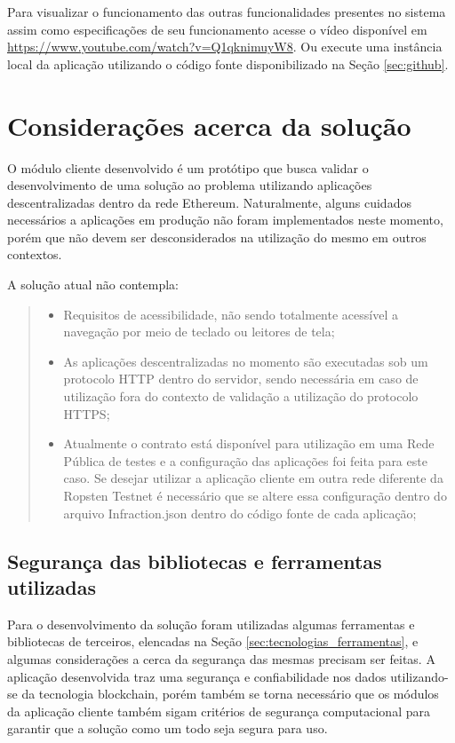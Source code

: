 Para visualizar o funcionamento das outras funcionalidades presentes no sistema assim como especificações de seu funcionamento acesse o vídeo disponível em \url{https://www.youtube.com/watch?v=Q1qknimuyW8}. Ou execute uma instância local da aplicação utilizando o código fonte disponibilizado na Seção \ref{sec:github}.
    
\section{Considerações acerca da solução}

O módulo cliente desenvolvido é um protótipo que busca validar o desenvolvimento de uma solução ao problema utilizando aplicações descentralizadas dentro da rede Ethereum. Naturalmente, alguns cuidados necessários a aplicações em produção não foram implementados neste momento, porém que não devem ser desconsiderados na utilização do mesmo em outros contextos.

A solução atual não contempla:

    \begin{quote}
        \begin{itemize}
            \item Requisitos de acessibilidade, não sendo totalmente acessível a navegação por meio de teclado ou leitores de tela;
            \item As aplicações descentralizadas no momento são executadas sob um protocolo HTTP dentro do servidor, sendo necessária em caso de utilização fora do contexto de validação a utilização do protocolo HTTPS;
             \item Atualmente o contrato está disponível para utilização em uma Rede Pública de testes e a configuração das aplicações foi feita para este caso. Se desejar utilizar a aplicação cliente em outra rede diferente da Ropsten Testnet é necessário que se altere essa configuração dentro do arquivo Infraction.json dentro do código fonte de cada aplicação;
        \end{itemize}
    \end{quote}
    

\subsection{Segurança das bibliotecas e ferramentas utilizadas}

Para o desenvolvimento da solução foram utilizadas algumas ferramentas e bibliotecas de terceiros, elencadas na Seção \ref{sec:tecnologias_ferramentas}, e algumas considerações a cerca da segurança das mesmas precisam ser feitas. A aplicação desenvolvida traz uma segurança e confiabilidade nos dados utilizando-se da tecnologia blockchain, porém também se torna necessário que os módulos da aplicação cliente também sigam critérios de segurança computacional para garantir que a solução como um todo seja segura para uso.

